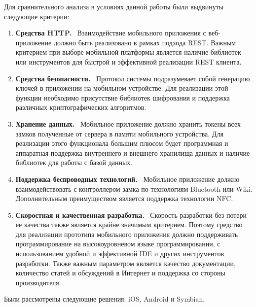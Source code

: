 Для сравнительного анализа в условиях данной работы были выдвинуты следующие критерии:

\begin{enumerate}
  \item \textbf{Средства HTTP.}\hfill ~\linebreak
        Взаимодействие мобильного приложения с веб-приложение должно быть реализовано в рамках подхода REST. Важным критерием при выборе мобильной платформы является наличие библиотек или инструментов для быстрой и эффективной реализации REST клиента.

  \item \textbf{Средства безопасности.}\hfill ~\linebreak
        Протокол системы подразумевает собой генерацию ключей в приложении на мобильном устройстве. Для реализации этой функции необходимо присутствие библиотек шифрования и поддержка различных криптографических алгоритмов.

  \item \textbf{Хранение данных.}\hfill ~\linebreak
        Мобильное приложение должно хранить токены всех замков полученные от сервера в памяти мобильного устройства. Для реализации этого функционала большим плюсом будет программная и аппаратная поддержка внутреннего и внешнего хранилища данных и наличие библиотек для работы с базой данных.

  \item \textbf{Поддержка беспроводных технологий.}\hfill ~\linebreak
        Мобильное приложение должно взаимодействовать с контроллером замка по технологиям Bluetooth или Wiki. Дополнительным преимуществом является поддержка технологии NFC.

  \item \textbf{Скоростная и качественная разработка.}\hfill ~\linebreak
        Скорость разработки без потери ее качества также является крайне значимым критерием. Поэтому средство для реализации прототипа мобильного приложения должно поддерживать программирование на высокоуровневом языке программировании, с использованием удобной и эффективной IDE и других инструментов разработки. Также важным параметром является качество документации, количество статей и обсуждений в Интернет и поддержка со стороны производителя.
\end{enumerate} 

Были рассмотрены следующие решения: iOS, Android и Symbian.

